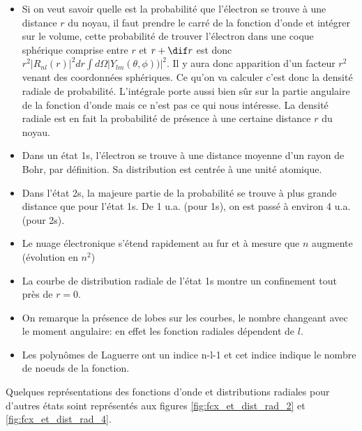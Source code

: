 \begin{itemize}
    \item Si on veut savoir quelle est la probabilité que l'électron se trouve à une distance $r$ du noyau, il faut prendre le carré de la fonction d'onde et intégrer sur le volume, cette probabilité de trouver l'électron dans une coque sphérique comprise entre $r$ et $r+\dif r$ est donc $r^2|R_{nl}(r)|^2dr\int d\Omega |Y_{lm}(\theta,\phi))|^2$. Il y aura donc apparition d'un facteur $r^2$ venant des coordonnées sphériques. Ce qu'on va calculer c'est donc la densité radiale de probabilité. L'intégrale porte aussi bien sûr sur la partie angulaire de la fonction d'onde mais ce n'est pas ce qui nous intéresse. La densité radiale est en fait la probabilité de présence à une certaine distance $r$ du noyau.
    \item Dans un état 1s, l'électron se trouve à une distance moyenne d'un rayon de Bohr, par définition. Sa distribution est centrée à une unité atomique.
    \item Dans l'état 2s, la majeure partie de la probabilité se trouve à plus grande distance que pour l'état 1s. De 1 u.a. (pour 1s), on est passé à environ 4 u.a. (pour 2s).
    \item Le nuage électronique s'étend rapidement au fur et à mesure que $n$ augmente (évolution en $n^2$)
    \item La courbe de distribution radiale de l'état 1s montre un confinement tout près de $r=0$.
    \item On remarque la présence de lobes sur les courbes, le nombre changeant avec le moment angulaire: en effet les fonction radiales dépendent de $l$.
    \item Les polynômes de Laguerre ont un indice n-l-1 et cet indice indique le nombre de noeuds de la fonction.
\end{itemize}
Quelques représentations des fonctions d'onde et distributions radiales pour d'autres états soint représentés aux figures \ref{fig:fcx_et_dist_rad_2} et \ref{fig:fcx_et_dist_rad_4}.

